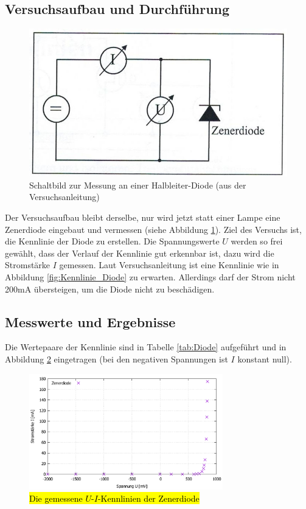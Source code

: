 \documentclass{scrartcl}
\begin{document}
\subsection{Versuchsaufbau und Durchführung}

\begin{figure}[H]
  \centering
    \includegraphics[scale=0.75]{Aufbau2.JPG}
  \caption{Schaltbild zur Messung an einer Halbleiter-Diode (aus der Versuchsanleitung)}
  \label{fig:Aufbau2}
\end{figure}

Der Versuchsaufbau bleibt derselbe, nur wird jetzt statt einer Lampe eine Zenerdiode eingebaut und vermessen (siehe Abbildung \ref{fig:Aufbau2}). Ziel des Versuchs ist, die Kennlinie der Diode zu erstellen. Die Spannungswerte $U$ werden so frei gewählt, dass der Verlauf der Kennlinie gut erkennbar ist, dazu wird die Stromstärke $I$ gemessen. Laut Versuchsanleitung ist eine Kennlinie wie in Abbildung \ref{fig:Kennlinie_Diode} zu erwarten. Allerdings darf der Strom nicht 200mA übersteigen, um die Diode nicht zu beschädigen.
\subsection{Messwerte und Ergebnisse}
Die Wertepaare der Kennlinie sind in Tabelle \ref{tab:Diode} aufgeführt und in Abbildung \ref{fig:V2_Kennlinie} eingetragen (bei den negativen Spannungen ist $I$ konstant null).

\begin{figure}[H]
  \centering
    \includegraphics[width=0.75\textwidth]{V2_Kennlinie.pdf}
  \caption{\hl{Die gemessene $U$-$I$-Kennlinien der Zenerdiode}}
  \label{fig:V2_Kennlinie}
\end{figure}
\end{document}
